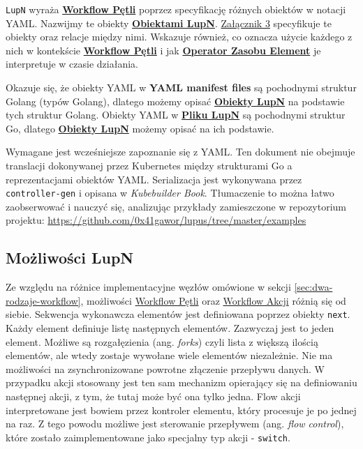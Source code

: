 \texttt{LupN} wyraża \hyperlink{def:workflow-petli}{\textbf{Workflow Pętli}} poprzez specyfikację różnych obiektów w notacji YAML. Nazwijmy te obiekty \hyperlink{def:obiekt-lupn}{\textbf{Obiektami LupN}}. \hyperref[appendix:3]{Załącznik 3} specyfikuje te obiekty oraz relacje między nimi. Wskazuje również, co oznacza użycie każdego z nich w kontekście \hyperlink{def:workflow-petli}{\textbf{Workflow Pętli}} i jak \hyperlink{def:operator-zasobu-element}{\textbf{Operator Zasobu Element}} je interpretuje w czasie działania.

Okazuje się, że obiekty YAML w \textbf{YAML manifest files} są pochodnymi struktur Golang (typów Golang), dlatego możemy opisać \hyperlink{def:obiekt-lupn}{\textbf{Obiekty LupN}} na podstawie tych struktur Golang. Obiekty YAML w \hyperlink{def:plik-lupn}{\textbf{Pliku LupN}} są pochodnymi struktur Go, dlatego \hyperlink{def:obiekt-lupn}{\textbf{Obiekty LupN}} możemy opisać na ich podstawie. 

Wymagane jest wcześniejsze zapoznanie się z YAML. Ten dokument nie obejmuje translacji dokonywanej przez Kubernetes między strukturami Go a reprezentacjami obiektów YAML. Serializacja jest wykonywana przez \texttt{controller-gen} i opisana w \textit{Kubebuilder Book}. Tłumaczenie to można łatwo zaobserwować i nauczyć się, analizując przykłady zamieszczone w repozytorium projektu: \url{https://github.com/0x41gawor/lupus/tree/master/examples}

\subsection{Możliwości LupN}

Ze względu na różnice implementacyjne węzłów omówione w sekcji \ref{sec:dwa-rodzaje-workflow}, możliwości \hyperlink{def:workflow-petli}{Workflow Pętli} oraz \hyperlink{def:workflow-akcji}{Workflow Akcji} różnią się od siebie. Sekwencja wykonawcza elementów jest definiowana poprzez obiekty \texttt{next}. Każdy element definiuje listę następnych elementów. Zazwyczaj jest to jeden element. Możliwe są rozgałęzienia (ang. \textit{forks}) czyli lista z większą ilością elementów, ale wtedy zostaje wywołane wiele elementów niezależnie. Nie ma możliwości na zsynchronizowane powrotne złączenie przepływu danych. W przypadku akcji stosowany jest ten sam mechanizm opierający się na definiowaniu następnej akcji, z tym, że tutaj może być ona tylko jedna. Flow akcji interpretowane jest bowiem przez kontroler elementu, który procesuje je po jednej na raz. Z tego powodu możliwe jest sterowanie przepływem (ang. \textit{flow control}), które zostało zaimplementowane jako specjalny typ akcji - \texttt{switch}. 

